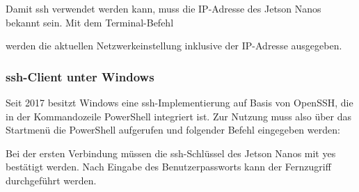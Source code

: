 \bigskip

Damit \ac{ssh} verwendet werden kann, muss die IP-Adresse des Jetson Nanos bekannt sein. Mit dem Terminal-Befehl

\medskip


\medskip

werden die aktuellen Netzwerkeinstellung inklusive der IP-Adresse ausgegeben.


%
%
%
%
%

%
%
%
%
%
%



\subsubsection{\ac{ssh}-Client unter Windows}


Seit 2017 besitzt Windows eine \ac{ssh}-Implementierung auf Basis von OpenSSH, die in der Kommandozeile PowerShell integriert ist. Zur Nutzung muss also über das Startmenü die PowerShell aufgerufen und folgender Befehl eingegeben werden:

\medskip


\medskip

Bei der ersten Verbindung müssen  die \ac{ssh}-Schlüssel des Jetson Nanos mit \glqq yes\grqq{} bestätigt werden. Nach Eingabe des Benutzerpassworts kann der Fernzugriff durchgeführt werden.



